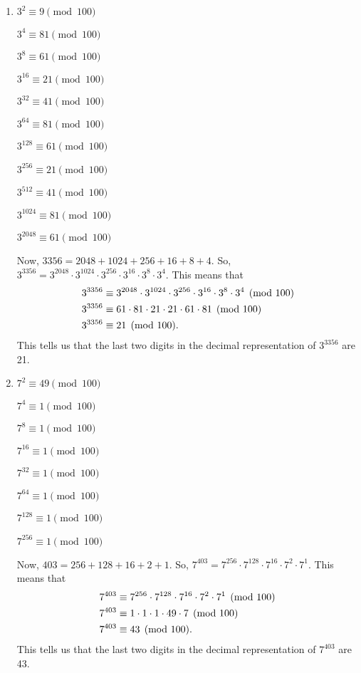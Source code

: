 \documentclass[11pt]{article}
\begin{document}
\begin{enumerate}
\item \begin{multicols}{3}
$3^2  \equiv 9 \pmod{100}$

$3^4  \equiv 81 \pmod{100}$

$3^8  \equiv 61 \pmod{100}$

$3^{16}  \equiv 21 \pmod{100}$

$3^{32}  \equiv 41 \pmod{100}$

$3^{64}  \equiv 81 \pmod{100}$

$3^{128}  \equiv 61 \pmod{100}$

$3^{256}  \equiv 21 \pmod{100}$

$3^{512}  \equiv 41 \pmod{100}$

$3^{1024} \equiv 81 \pmod{100}$

$3^{2048} \equiv 61 \pmod{100}$
\end{multicols}
Now,  $3356 = 2048 + 1024 + 256 + 16 + 8 + 4$.  So,  
$3^{3356}  = 3^{2048}  \cdot 3^{1024}  \cdot 3^{256}  \cdot 3^{16} \cdot 3^8 \cdot 3^4$.  This means that
\begin{align*}
  3^{3356}  &\equiv 3^{2048}  \cdot 3^{1024}  \cdot 3^{256}  \cdot 3^{16} \cdot 3^8 \cdot 3^4  \pmod{100} \hfill \\
  3^{3356}  &\equiv 61 \cdot 81 \cdot 21 \cdot 21 \cdot 61 \cdot 81 \pmod{100} \hfill \\
  3^{3356}  &\equiv 21 \pmod{100}. 
\end{align*}
This tells us that the last two digits in the decimal representation of  $3^{3356} $
 are  21.


\newpage
\item \begin{multicols}{3}
$7^2  \equiv 49 \pmod{100}$

$7^4  \equiv 1 \pmod{100}$

$7^8  \equiv 1 \pmod{100}$

$7^{16}  \equiv 1 \pmod{100}$

$7^{32}  \equiv 1 \pmod{100}$

$7^{64}  \equiv 1 \pmod{100}$

$7^{128}  \equiv 1 \pmod{100}$

$7^{256}  \equiv 1 \pmod{100}$
\end{multicols}
Now,  $403 = 256 + 128 + 16 + 2 + 1$.  So,  
$7^{403}  = 7^{256}  \cdot 7^{128}  \cdot 7^{16}  \cdot 7^2 \cdot 7^1$.  This means that
\begin{align*}
  7^{403}  &\equiv 7^{256}  \cdot 7^{128}  \cdot 7^{16}  \cdot 7^2 \cdot 7^1  \pmod{100} \hfill \\
  7^{403}  &\equiv 1 \cdot 1 \cdot 1 \cdot 49 \cdot 7 \pmod{100} \hfill \\
  7^{403}  &\equiv 43 \pmod{100}. 
\end{align*}
This tells us that the last two digits in the decimal representation of  $7^{403} $
 are  43.



\end{enumerate}
\end{document}
